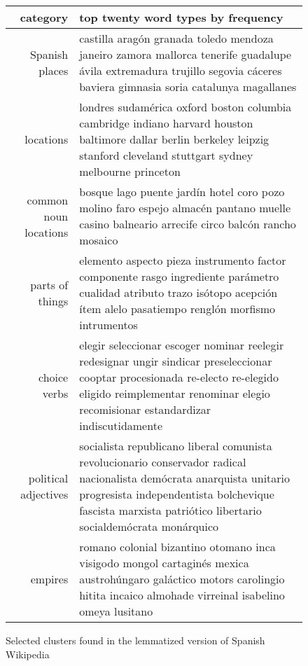 \begin{figure*}[t!]
  \begin{tabular}{|r|p{10cm}|}
    \hline
    category  & top twenty word types by frequency \\
    \hline
    Spanish places &  castilla aragón granada toledo mendoza janeiro zamora
    mallorca tenerife guadalupe ávila extremadura trujillo segovia cáceres
    baviera gimnasia soria catalunya magallanes \\
    \hline
    locations &  londres sudamérica oxford boston columbia cambridge indiano
    harvard houston baltimore dallar berlin berkeley leipzig stanford cleveland
    stuttgart sydney melbourne princeton \\
    \hline
    common noun locations & bosque lago puente jardín hotel coro pozo molino
    faro espejo almacén pantano muelle casino balneario arrecife circo balcón
    rancho mosaico \\
    \hline
    parts of things & elemento aspecto pieza instrumento factor componente
    rasgo ingrediente parámetro cualidad atributo trazo isótopo acepción ítem
    alelo pasatiempo renglón morfismo intrumentos \\
    \hline
    choice verbs & elegir seleccionar escoger nominar reelegir redesignar ungir
    sindicar preseleccionar cooptar procesionada re-electo re-elegido eligido
    reimplementar renominar elegio recomisionar estandardizar indiscutidamente
    \\
    \hline
    political adjectives & socialista republicano liberal comunista
    revolucionario conservador radical nacionalista demócrata anarquista
    unitario progresista independentista bolchevique fascista marxista
    patriótico libertario socialdemócrata monárquico \\
    \hline
    empires & romano colonial bizantino otomano inca visigodo mongol cartaginés
    mexica austrohúngaro galáctico motors carolingio hitita incaico almohade
    virreinal isabelino omeya lusitano \\
    \hline
  \end{tabular}
\caption{Selected clusters found in the lemmatized version of Spanish Wikipedia}
\label{fig:clusters-wikipedia-lemma}
\end{figure*}


